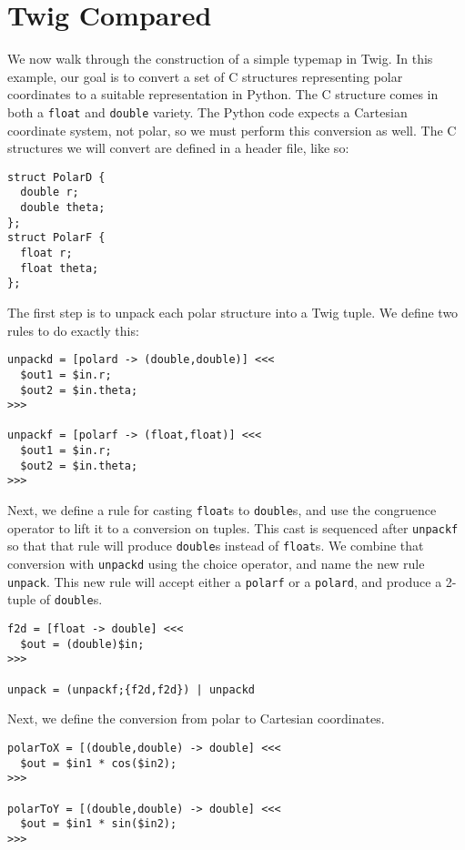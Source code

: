 
\section{Twig Compared}
\label{sec:eval:swig}

We now walk through the construction of a simple typemap in Twig.
In this example, our goal is to convert a set of C structures
representing polar coordinates to a suitable representation in
Python. The C structure comes in both a \texttt{float} and
\texttt{double} variety. The Python code expects a Cartesian
coordinate system, not polar, so we must perform this conversion
as well. The C structures we will convert are defined in a header
file, like so:

\begin{verbatim}
struct PolarD {
  double r;
  double theta;
};
struct PolarF {
  float r;
  float theta;
};
\end{verbatim}

The first step is to unpack each polar structure into a Twig
tuple. We define two rules to do exactly this:

\begin{verbatim}
unpackd = [polard -> (double,double)] <<<
  $out1 = $in.r;
  $out2 = $in.theta;
>>>

unpackf = [polarf -> (float,float)] <<<
  $out1 = $in.r;
  $out2 = $in.theta;
>>>
\end{verbatim}

Next, we define a rule for casting \texttt{float}s to
\texttt{double}s, and use the congruence operator to lift it to a
conversion on tuples. This cast is sequenced after
\texttt{unpackf} so that that rule will produce \texttt{double}s
instead of \texttt{float}s. We combine that conversion with
\texttt{unpackd} using the choice operator, and name the new rule
\texttt{unpack}. This new rule will accept either a
\texttt{polarf} or a \texttt{polard}, and produce a 2-tuple of
\texttt{double}s.

\begin{verbatim}
f2d = [float -> double] <<<
  $out = (double)$in;
>>>

unpack = (unpackf;{f2d,f2d}) | unpackd
\end{verbatim}

Next, we define the conversion from polar to Cartesian
coordinates.

\begin{verbatim}
polarToX = [(double,double) -> double] <<<
  $out = $in1 * cos($in2);  
>>>

polarToY = [(double,double) -> double] <<<
  $out = $in1 * sin($in2);
>>>
\end{verbatim}

